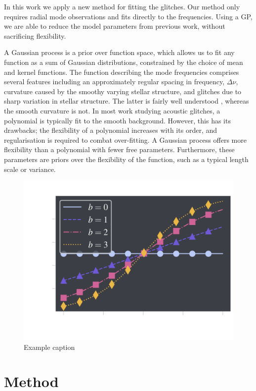 \documentclass[linenumbers,modern,astrosymb,times]{aastex631dm}
\newcommand{\figwidth}{0.6\linewidth}
\newcommand{\figwidth}{1.0\linewidth}
\begin{document}
In this work we apply a new method for fitting the glitches. Our method only
requires radial mode observations and fits directly to the frequencies. Using
a GP, we are able to reduce the model parameters from previous work, without
sacrificing flexibility.

A Gaussian process is a prior over function space, which allows us to fit any
function as a sum of Gaussian distributions, constrained by the choice of mean and kernel
functions. The function describing the mode frequencies comprises several
features including an approximately regular spacing in frequency,
\(\Delta\nu\), curvature caused by the smoothy varying stellar structure, and
glitches due to sharp variation in stellar structure. The latter is fairly well
understood \citep{Houdek:2007}, whereas the smooth curvature is not. In
most work studying acoustic glitches, a polynomial is typically fit
to the smooth background. However, this has its drawbacks; the flexibility
of a polynomial increases with its order, and regularisation is required to
combat over-fitting. A Gaussian process offers more flexibility than a
polynomial with fewer free parameters. Furthermore, these parameters are priors
over the flexibility of the function, such as a typical length scale or
variance.

\begin{figure}
    \centering
    \includegraphics[width=\figwidth]{example-figure}
    \caption{Example caption}
\end{figure}

\section{Method}\label{sec:method}
\end{document}
